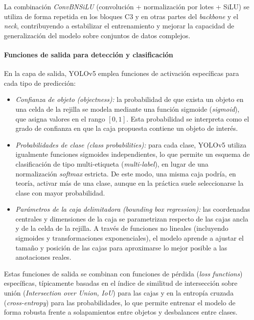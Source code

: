 \par La combinación \textit{ConvBNSiLU} (convolución + normalización por lotes + SiLU) se utiliza de forma repetida en los bloques C3 y en otras partes del \textit{backbone} y el \textit{neck}, contribuyendo a estabilizar el entrenamiento y mejorar la capacidad de generalización del modelo sobre conjuntos de datos complejos.

\paragraph{Funciones de salida para detección y clasificación}

\par En la capa de salida, YOLOv5 emplea funciones de activación específicas para cada tipo de predicción:

\begin{itemize}
    \item \textit{Confianza de objeto (\textit{objectness}):} la probabilidad de que exista un objeto en una celda de la rejilla se modela mediante una función sigmoide (\textit{sigmoid}), que asigna valores en el rango $[0,1]$. Esta probabilidad se interpreta como el grado de confianza en que la caja propuesta contiene un objeto de interés.
    \item \textit{Probabilidades de clase (\textit{class probabilities}):} para cada clase, YOLOv5 utiliza igualmente funciones sigmoides independientes, lo que permite un esquema de clasificación de tipo multi-etiqueta (\textit{multi-label}), en lugar de una normalización \textit{softmax} estricta. De este modo, una misma caja podría, en teoría, activar más de una clase, aunque en la práctica suele seleccionarse la clase con mayor probabilidad.
    \item \textit{Parámetros de la caja delimitadora (\textit{bounding box regression}):} las coordenadas centrales y dimensiones de la caja se parametrizan respecto de las cajas ancla y de la celda de la rejilla. A través de funciones no lineales (incluyendo sigmoides y transformaciones exponenciales), el modelo aprende a ajustar el tamaño y posición de las cajas para aproximarse lo mejor posible a las anotaciones reales.
\end{itemize}

\par Estas funciones de salida se combinan con funciones de pérdida (\textit{loss functions}) específicas, típicamente basadas en el índice de similitud de intersección sobre unión (\textit{Intersection over Union, IoU}) para las cajas y en la entropía cruzada (\textit{cross-entropy}) para las probabilidades, lo que permite entrenar el modelo de forma robusta frente a solapamientos entre objetos y desbalances entre clases.

